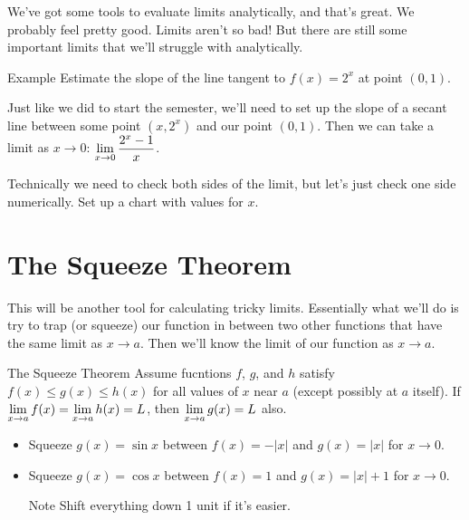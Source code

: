 We've got some tools to evaluate limits analytically, and that's great.
We probably feel pretty good.
Limits aren't so bad!
But there are still some important limits that we'll struggle with analytically.

\begin{note}{Example}
  Estimate the slope of the line tangent to $f(x) = 2^x$ at point $(0,1)$.

  Just like we did to start the semester, we'll need to set up the slope of a secant line between some point $(x, 2^x)$ and our point $(0,1)$.
  Then we can take a limit as $x\to0$: $\displaystyle \lim_{x\to0} \dfrac{2^x-1}{x}$.

  Technically we need to check both sides of the limit, but let's just check one side numerically.
   Set up a chart with values for $x$.
\end{note}

\section*{The Squeeze Theorem}

This will be another tool for calculating tricky limits.
Essentially what we'll do is try to trap (or squeeze) our function in between two other functions that have the same limit as $x\to a$.
Then we'll know the limit of our function as $x \to a$.

\begin{thm}{The Squeeze Theorem}
  Assume fucntions $f$, $g$, and $h$ satisfy $f(x) \leq g(x) \leq h(x)$ for all values of $x$ near $a$ (except possibly at $a$ itself).
  If $\displaystyle \lim_{x\to a} f(x) = \displaystyle \lim_{x\to a} h(x) = L$, then $\displaystyle \lim_{x\to a} g(x) = L$ also.
\end{thm}

\begin{itemize}
  \item Squeeze $g(x) = \sin x$ between $f(x) =-|x|$ and $g(x) = |x|$ for $x\to 0$.
  \item Squeeze $g(x) = \cos x$ between $f(x) =1$ and $g(x) = |x|+1$ for $x\to 0$.
  \begin{note}{Note}
    Shift everything down 1 unit if it's easier.
  \end{note}
\end{itemize}

